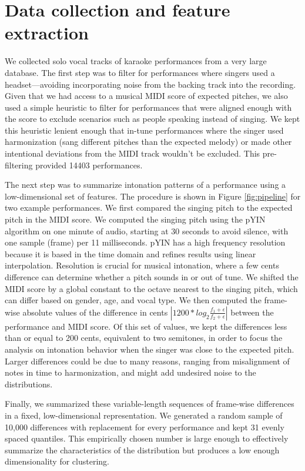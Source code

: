 \section{Data collection and feature extraction}
\label{sec:features}
We collected solo vocal tracks of karaoke performances from a very large database. The first step was to filter for performances where singers used a headset---avoiding incorporating noise from the backing track into the recording. Given that we had access to a musical MIDI score of expected pitches, we also used a simple heuristic to filter for performances that were aligned enough with the score to exclude scenarios such as people speaking instead of singing. We kept this heuristic lenient enough that in-tune performances where the singer used harmonization (sang different pitches than the expected melody) or made other intentional deviations from the MIDI track wouldn't be excluded. This pre-filtering provided 14403 performances. 

The next step was to summarize intonation patterns of a performance using a low-dimensional set of features. The procedure is shown in Figure \ref{fig:pipeline} for two example performances. We first compared the singing pitch to the expected pitch in the MIDI score. We computed the singing pitch using the pYIN algorithm \cite{mauch2014pyin} on one minute of audio, starting at 30 seconds to avoid silence, with one sample (frame) per 11 milliseconds. pYIN has a high frequency resolution because it is based in the time domain and refines results using linear interpolation. Resolution is crucial for musical intonation, where a few cents difference can determine whether a pitch sounds in or out of tune. We shifted the MIDI score by a global constant to the octave nearest to the singing pitch, which can differ based on gender, age, and vocal type. We then computed the frame-wise absolute values of the difference in cents $\left| 1200 * log_2 \frac{f_1 + \epsilon} {f_2 + \epsilon} \right|$ between the performance and MIDI score. Of this set of values, we kept the differences less than or equal to 200 cents, equivalent to two semitones, in order to focus the analysis on intonation behavior when the singer was close to the expected pitch. Larger differences could be due to many reasons, ranging from misalignment of notes in time to harmonization, and might add undesired noise to the distributions. 

Finally, we summarized these variable-length sequences of frame-wise differences in a fixed, low-dimensional representation. We generated a random sample of 10,000 differences with replacement for every performance and kept 31 evenly spaced quantiles. This empirically chosen number is large enough to effectively summarize the characteristics of the distribution but produces a low enough dimensionality for clustering.

